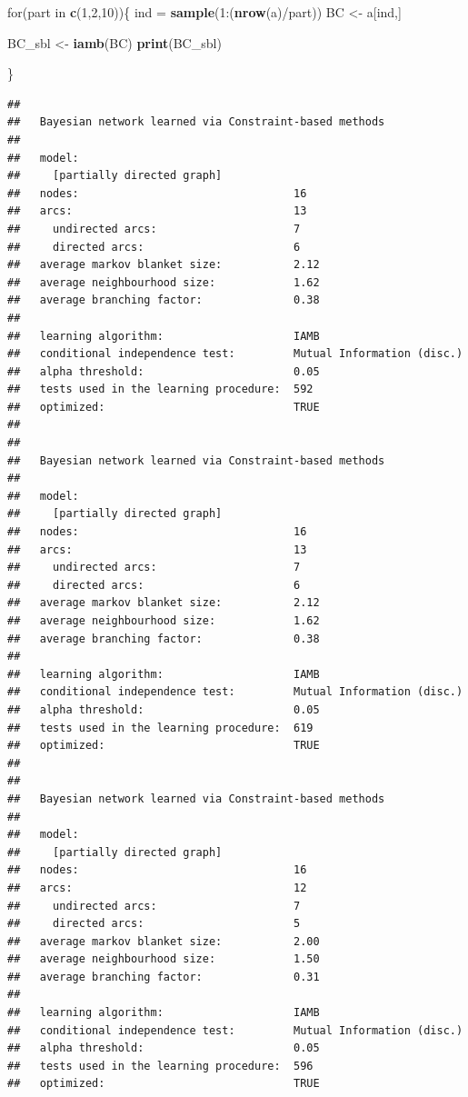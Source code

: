 \documentclass[]{article}
\newenvironment{Shaded}{\begin{snugshade}}{\end{snugshade}}
\newcommand{\KeywordTok}[1]{\textcolor[rgb]{0.13,0.29,0.53}{\textbf{{#1}}}}
\newcommand{\DecValTok}[1]{\textcolor[rgb]{0.00,0.00,0.81}{{#1}}}
\newcommand{\StringTok}[1]{\textcolor[rgb]{0.31,0.60,0.02}{{#1}}}
\newcommand{\NormalTok}[1]{{#1}}
\begin{document}
\begin{Shaded}
\begin{Highlighting}[]
\NormalTok{for(part in }\KeywordTok{c}\NormalTok{(}\DecValTok{1}\NormalTok{,}\DecValTok{2}\NormalTok{,}\DecValTok{10}\NormalTok{))\{}
    \NormalTok{ind =}\StringTok{ }\KeywordTok{sample}\NormalTok{(}\DecValTok{1}\NormalTok{:(}\KeywordTok{nrow}\NormalTok{(a)/part))}
    \NormalTok{BC <-}\StringTok{ }\NormalTok{a[ind,]}
    
    \NormalTok{BC_sbl <-}\StringTok{ }\KeywordTok{iamb}\NormalTok{(BC)}
    \KeywordTok{print}\NormalTok{(BC_sbl)}

\NormalTok{\}}
\end{Highlighting}
\end{Shaded}

\begin{verbatim}
## 
##   Bayesian network learned via Constraint-based methods
## 
##   model:
##     [partially directed graph]
##   nodes:                                 16 
##   arcs:                                  13 
##     undirected arcs:                     7 
##     directed arcs:                       6 
##   average markov blanket size:           2.12 
##   average neighbourhood size:            1.62 
##   average branching factor:              0.38 
## 
##   learning algorithm:                    IAMB 
##   conditional independence test:         Mutual Information (disc.) 
##   alpha threshold:                       0.05 
##   tests used in the learning procedure:  592 
##   optimized:                             TRUE 
## 
## 
##   Bayesian network learned via Constraint-based methods
## 
##   model:
##     [partially directed graph]
##   nodes:                                 16 
##   arcs:                                  13 
##     undirected arcs:                     7 
##     directed arcs:                       6 
##   average markov blanket size:           2.12 
##   average neighbourhood size:            1.62 
##   average branching factor:              0.38 
## 
##   learning algorithm:                    IAMB 
##   conditional independence test:         Mutual Information (disc.) 
##   alpha threshold:                       0.05 
##   tests used in the learning procedure:  619 
##   optimized:                             TRUE 
## 
## 
##   Bayesian network learned via Constraint-based methods
## 
##   model:
##     [partially directed graph]
##   nodes:                                 16 
##   arcs:                                  12 
##     undirected arcs:                     7 
##     directed arcs:                       5 
##   average markov blanket size:           2.00 
##   average neighbourhood size:            1.50 
##   average branching factor:              0.31 
## 
##   learning algorithm:                    IAMB 
##   conditional independence test:         Mutual Information (disc.) 
##   alpha threshold:                       0.05 
##   tests used in the learning procedure:  596 
##   optimized:                             TRUE
\end{verbatim}
\end{document}
